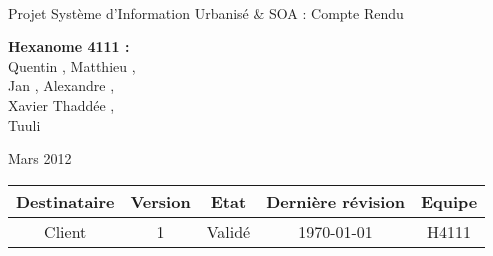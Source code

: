 \documentclass[a4paper]{article}
\begin{document}
\begin{titlepage}
~ 
\vfill
	\begin{center}
		\begin{Huge}
		Projet Système d'Information Urbanisé \& SOA : Compte Rendu\\ %
		\end{Huge} 
\vfill
		\textbf{Hexanome 4111 :} 
		\\Quentin {}, Matthieu , 
		\\Jan {}, Alexandre , 
		\\Xavier {}Thaddée ,
		\\Tuuli {}
\vfill		
		\begin{Large}
		Mars 2012
		\end{Large}
\vfill
	\begin{tabular}{|c|c|c|c|c|}
 	 \hline
   Destinataire & Version & Etat & Dernière révision & Equipe \\
   \hline
   Client & 1 & Validé & \today & H4111 \\
   \hline
	\end{tabular}
	\end{center}
\vfill
\end{titlepage}
\newpage
\tableofcontents
\newpage




\end{document}
